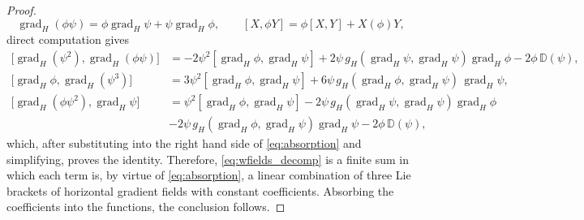 \documentclass[10pt,a4paper]{amsart}
\DeclareMathOperator{\grad}{\mathrm{grad}}
\begin{document}
\begin{proof}
%
$$\grad_H(\phi \psi) = \phi\grad_H \psi + \psi \grad_H \phi, \qquad [X, \phi Y] = \phi [X, Y] + X(\phi)Y,$$ 
%
direct computation gives
%
\begin{align*}
\bigl[ \grad_H(\psi^{2}), \grad_H(\phi \psi) \bigr]
&= -2\psi^{2} [\grad_H \phi, \grad_H \psi] + 2\psi\,g_H(\grad_H \psi,\grad_H \psi) \grad_H \phi - 2\phi \,\mathbb{D}(\psi),\\
\bigl[ \grad_H \phi, \grad_H(\psi^{3}) \bigr]
&= 3\psi^{2} [\grad_H \phi, \grad_H \psi] + 6\psi\, g_H(\grad_H \phi,\grad_H \psi) \,\grad_H \psi,\\
\bigl[ \grad_H(\phi \psi^{2}), \grad_H \psi \bigr]
&= \psi^{2} [\grad_H \phi, \grad_H \psi] - 2\psi \,g_H(\grad_H \psi,\grad_H \psi)\grad_H \phi\\
&- 2\psi \, g_H(\grad_H \phi,\grad_H \psi)\grad_H \psi - 2\phi\, \mathbb{D}(\psi),
\end{align*}
%
which, after substituting into the right hand side of \eqref{eq:absorption} and simplifying, proves the identity.
%
Therefore, \eqref{eq:wfields_decomp} is a finite sum in which each term is, by virtue of \eqref{eq:absorption}, a linear combination of three Lie brackets of horizontal gradient fields with constant coefficients. Absorbing the coefficients into the functions, the conclusion follows.
\end{proof}
\end{document}
